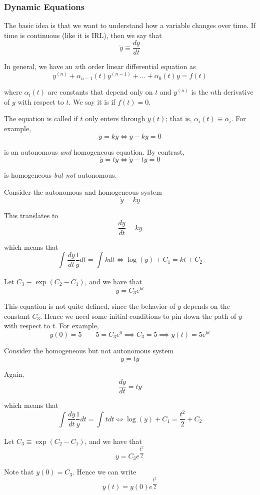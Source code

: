 \documentclass{article}
\begin{document}
\subsubsection{Dynamic Equations}
\label{ssub:dynamic_equations}

The basic idea is that we want to understand how a variable changes over time. If time is continuous (like it is IRL), then we say that
\[
  \dot{y}
  \equiv
  \dfrac{dy}{dt}
\]

In general, we have an $n$th order linear differential equation as
\[
  y^{(n)} + \alpha_{n - 1}(t) y^{(n - 1)} + \ldots + \alpha_0(t) y = f(t)
\]

where $\alpha_{i}(t)$ are constants that depend only on $t$ and $y^{(n)}$ is the $n$th derivative of $y$ with respect to $t$. We say it is  if $f(t) = 0$.

The equation is called  if $t$ only enters through $y(t)$; that is, $\alpha_i(t) \equiv \alpha_i$. For example,
\[
  \dot{y} = k y
  \iff
  \dot{y} - k y = 0
\]

is an autonomous \textit{and} homogeneous equation. By contrast,
\[
  \dot{y} = t y
  \iff
  \dot{y} - t y = 0
\]

is homogeneous \textit{but not} autonomous.  
\begin{example}
  Consider the autonomous and homogeneous system
  \[
    \dot{y} = ky
  \]

  This translates to
  \[
    \dfrac{dy}{dt} = ky
  \]

  which means that
  \[
    \int_{}^{} \dfrac{dy}{dt} \dfrac{1}{y} dt
    =
    \int_{}^{} k dt
    \iff
    \log(y) + C_1 = kt + C_2
  \]

  Let $C_3 \equiv \exp(C_2 - C_1)$, and we have that
  \[
    y = C_3 e^{kt}
  \]

  This equation is not quite defined, since the behavior of $y$ depends on the constant $C_3$. Hence we need some initial conditions to pin down the path of $y$ with respect to $t$. For example,
  \[
    y(0) = 5
    \quad\quad
    5 = C_3 e^{0}
    \implies
    C_3 = 5
    \implies
    y(t) = 5 e^{kt}
  \]
\end{example}

\begin{example}
  Consider the homogeneous but not autonomous system
  \[
    \dot{y} = ty
  \]


  Again,
  \[
    \dfrac{dy}{dt} = ty
  \]

  which means that
  \[
    \int_{}^{} \dfrac{dy}{dt} \dfrac{1}{y} dt
    =
    \int_{}^{} t dt
    \iff
    \log(y) + C_1 = \dfrac{t^2}{2} + C_2
  \]

  Let $C_3 \equiv \exp(C_2 - C_1)$, and we have that
  \[
    y = C_3 e^{\dfrac{t^2}{2}}
  \]

  Note that $y(0) = C_3$. Hence we can write
  \[
    y(t) = y(0) e^{\dfrac{t^2}{2}}
  \]
\end{example}
\end{document}
